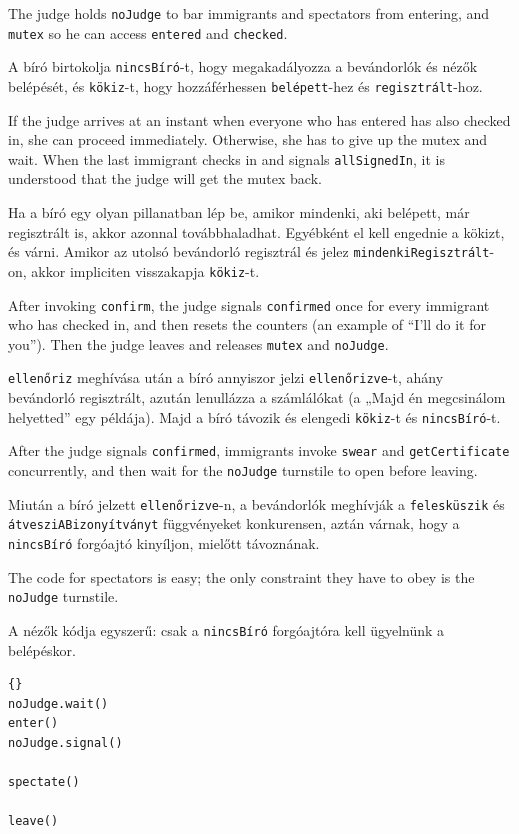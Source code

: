 \documentclass{book}
\begin{document}
The judge holds {\tt noJudge} to bar immigrants and spectators
from entering, and {\tt mutex} so he can access {\tt entered}
and {\tt checked}.

A bíró birtokolja {\tt nincsBíró}-t, hogy megakadályozza a
bevándorlók és nézők belépését, és {\tt kökiz}-t, hogy hozzáférhessen
{\tt belépett}-hez és {\tt regisztrált}-hoz.

If the judge arrives at an instant when everyone who has
entered has also checked in, she can proceed immediately.  Otherwise,
she has to give up the mutex and wait.  When the last immigrant
checks in and signals {\tt allSignedIn}, it is understood that the
judge will get the mutex back.

Ha a bíró  egy olyan pillanatban lép be, amikor mindenki,
aki belépett, már regisztrált is, akkor azonnal továbbhaladhat.
Egyébként el kell engednie a kökizt, és várni. Amikor az
utolsó bevándorló regisztrál és jelez {\tt mindenkiRegisztrált}-on,
akkor impliciten visszakapja {\tt kökiz}-t.

After invoking {\tt confirm}, the judge signals {\tt confirmed}
once for every immigrant who has checked in, and then resets
the counters (an example of ``I'll do it for you'').
Then the judge leaves and releases {\tt mutex} and {\tt noJudge}.

{\tt ellenőriz} meghívása után a bíró annyiszor jelzi {\tt ellenőrizve}-t,
ahány bevándorló regisztrált, azután lenullázza a számlálókat
(a „Majd én megcsinálom helyetted” egy példája). Majd a bíró
távozik és elengedi {\tt kökiz}-t és {\tt nincsBíró}-t.

After the judge signals {\tt confirmed}, immigrants invoke
{\tt swear} and {\tt getCertificate} concurrently, and then
wait for the {\tt noJudge} turnstile to open before leaving.

Miután a bíró jelzett {\tt ellenőrizve}-n, a bevándorlók meghívják
a {\tt felesküszik} és {\tt átvesziABizonyítványt} függvényeket
konkurensen, aztán várnak, hogy a {\tt nincsBíró} forgóajtó
kinyíljon, mielőtt távoznának.

The code for spectators is easy; the only constraint they have
to obey is the {\tt noJudge} turnstile.

A nézők kódja egyszerű: csak a {\tt nincsBíró} forgóajtóra
kell ügyelnünk a belépéskor.

\begin{lstlisting}[title={Faneuil Hall problem solution (spectator)}]{}
noJudge.wait()
enter()
noJudge.signal()

spectate()

leave()
\end{lstlisting}
\end{document}
